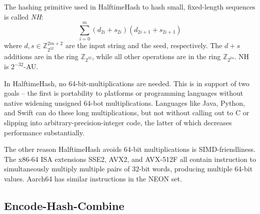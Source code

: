 \documentclass[runningheads]{llncs}
\newcommand{\ints}{\mathbb{Z}}
\begin{document}
The hashing primitive used in HalftimeHash to hash small, fixed-length sequences is called {\em NH}: \cite{umac}
\[
\sum_{i=0}^m (d_{2i} + s_{2i})(d_{2i+1} + s_{2i+1})
\]
where $d, s \in \ints_{2^32}^{2m+2}$ are the input string and the seed, respectively.
The $d + s$ additions are in the ring $\ints_{2^{32}}$, while all other operations are in the ring $\ints_{2^{64}}$.
NH is $2^{-32}$-AU.

In HalftimeHash, no 64-bit-mul\-ti\-pli\-ca\-tions are needed.
This is in support of two goals --
the first is portability to platforms or programming languages without native widening unsigned 64-bot multiplications.
Languages like Java, Python, and Swift can do these long multiplications, but not without calling out to C or slipping into arbitrary-precision-integer code, the latter of which decreases performance substantially.


The other reason HalftimeHash avoids 64-bit multiplications is SIMD-friend\-li\-ness.
The x86-64 ISA extensions SSE2, AVX2, and AVX-512F all contain instruction to simultaneously multiply multiple pairs of 32-bit words, producing multiple 64-bit values.
Aarch64 has similar instructions in the NEON set.






\subsection{Encode-Hash-Combine}
\end{document}
